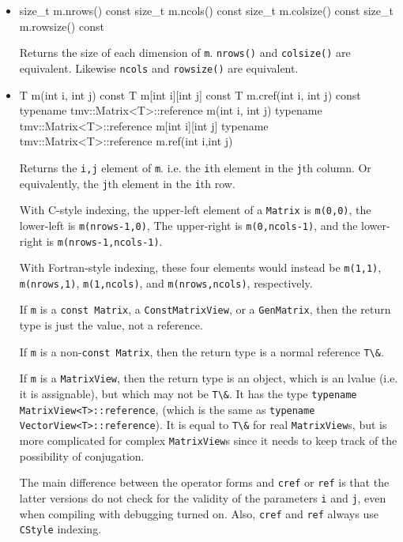 \documentclass[twoside,letterpaper,11pt]{article}
\renewcommand{\tt}[1]{{\lstinline {#1}}}
\begin{document}
\begin{itemize}
\item
\begin{tmvcode}
size_t m.nrows() const
size_t m.ncols() const
size_t m.colsize() const
size_t m.rowsize() const
\end{tmvcode}
Returns the size of each dimension of \tt{m}.  \tt{nrows()} and \tt{colsize()} are equivalent.
Likewise \tt{ncols} and \tt{rowsize()} are equivalent.

\item
\begin{tmvcode}
T m(int i, int j) const
T m[int i][int j] const
T m.cref(int i, int j) const
typename tmv::Matrix<T>::reference m(int i, int j)
typename tmv::Matrix<T>::reference m[int i][int j]
typename tmv::Matrix<T>::reference m.ref(int i,int j)
\end{tmvcode}
Returns the \tt{i,j} element of \tt{m}. i.e. the \tt{i}th element in the 
\tt{j}th column.  Or
equivalently, the \tt{j}th element in the \tt{i}th row. 

With C-style indexing, the upper-left element
of a \tt{Matrix} is \tt{m(0,0)}, the lower-left is \tt{m(nrows-1,0)},
The upper-right is \tt{m(0,ncols-1)}, and the lower-right is
\tt{m(nrows-1,ncols-1)}.

With Fortran-style indexing, these four elements would instead be
\tt{m(1,1)}, \tt{m(nrows,1)}, \tt{m(1,ncols)}, and \tt{m(nrows,ncols)},
respectively.

If \tt{m} is a 
\tt{const Matrix}, a \tt{ConstMatrixView}, or a \tt{GenMatrix}, 
then the return type is just the value, not a reference.

If \tt{m} is a 
non-\tt{const Matrix}, then the return type is a normal reference \tt{T\&}.

If \tt{m} is a \tt{MatrixView}, then the return type is an object,
which is an lvalue (i.e. it is assignable), but which may not be \tt{T\&}.
It has the type \tt{typename MatrixView<T>::reference}, 
(which is the same as \tt{typename VectorView<T>::reference}).
It is equal to \tt{T\&} for real \tt{MatrixView}s, but is
more complicated for complex \tt{MatrixView}s since it needs to 
keep track of the possibility of conjugation.

The main difference between the operator forms and \tt{cref} or \tt{ref} is that the latter versions do not
check for the validity of the parameters \tt{i} and \tt{j}, even when compiling with debugging turned on.
Also, \tt{cref} and \tt{ref} always use \tt{CStyle} indexing.


\end{itemize}
\end{document}
